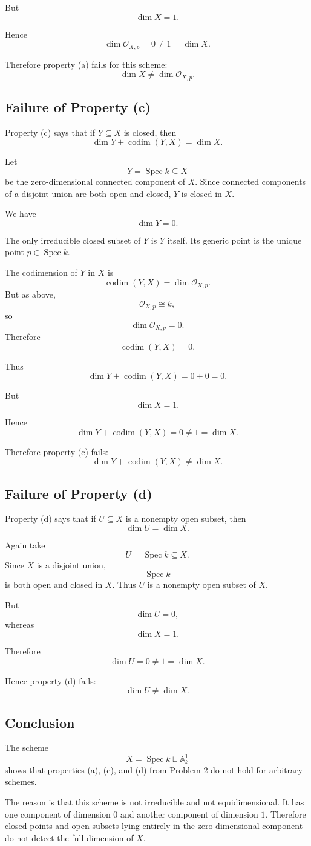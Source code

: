 But
\[
\dim X=1.
\]

Hence
\[
\dim \mathcal O_{X,p}=0\neq 1=\dim X.
\]

Therefore property (a) fails for this scheme:
\[
\boxed{\dim X\neq \dim \mathcal O_{X,p}.}
\]

\subsection{Failure of Property (c)}

Property (c) says that if \(Y\subseteq X\) is closed, then
\[
\dim Y+\operatorname{codim}(Y,X)=\dim X.
\]

Let
\[
Y=\operatorname{Spec} k\subseteq X
\]
be the zero-dimensional connected component of \(X\). Since connected components of a disjoint union are both open and closed, \(Y\) is closed in \(X\).

We have
\[
\dim Y=0.
\]

The only irreducible closed subset of \(Y\) is \(Y\) itself. Its generic point is the unique point \(p\in \operatorname{Spec} k\).

The codimension of \(Y\) in \(X\) is
\[
\operatorname{codim}(Y,X)=\dim \mathcal O_{X,p}.
\]
But as above,
\[
\mathcal O_{X,p}\cong k,
\]
so
\[
\dim \mathcal O_{X,p}=0.
\]
Therefore
\[
\operatorname{codim}(Y,X)=0.
\]

Thus
\[
\dim Y+\operatorname{codim}(Y,X)=0+0=0.
\]

But
\[
\dim X=1.
\]

Hence
\[
\dim Y+\operatorname{codim}(Y,X)=0\neq 1=\dim X.
\]

Therefore property (c) fails:
\[
\boxed{\dim Y+\operatorname{codim}(Y,X)\neq \dim X.}
\]

\subsection{Failure of Property (d)}

Property (d) says that if \(U\subseteq X\) is a nonempty open subset, then
\[
\dim U=\dim X.
\]

Again take
\[
U=\operatorname{Spec} k\subseteq X.
\]
Since \(X\) is a disjoint union,
\[
\operatorname{Spec} k
\]
is both open and closed in \(X\). Thus \(U\) is a nonempty open subset of \(X\).

But
\[
\dim U=0,
\]
whereas
\[
\dim X=1.
\]

Therefore
\[
\dim U=0\neq 1=\dim X.
\]

Hence property (d) fails:
\[
\boxed{\dim U\neq \dim X.}
\]

\subsection*{Conclusion}

The scheme
\[
X=\operatorname{Spec} k\sqcup \mathbb A^1_k
\]
shows that properties (a), (c), and (d) from Problem 2 do not hold for arbitrary schemes.

The reason is that this scheme is not irreducible and not equidimensional. It has one component of dimension \(0\) and another component of dimension \(1\). Therefore closed points and open subsets lying entirely in the zero-dimensional component do not detect the full dimension of \(X\).
